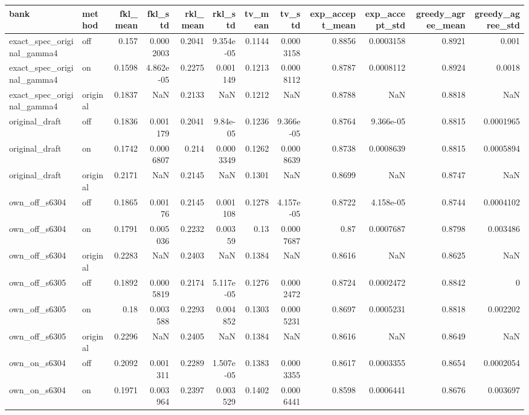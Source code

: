 \begin{table}
\label{tab:task3_alignment_main}
\begin{tabular}{llrrrrrrrrrr}
\toprule
bank & method & fkl\_mean & fkl\_std & rkl\_mean & rkl\_std & tv\_mean & tv\_std & exp\_accept\_mean & exp\_accept\_std & greedy\_agree\_mean & greedy\_agree\_std \\
\midrule
exact\_spec\_original\_gamma4 & off & 0.157 & 0.0002003 & 0.2041 & 9.354e-05 & 0.1144 & 0.0003158 & 0.8856 & 0.0003158 & 0.8921 & 0.001 \\
exact\_spec\_original\_gamma4 & on & 0.1598 & 4.862e-05 & 0.2275 & 0.001149 & 0.1213 & 0.0008112 & 0.8787 & 0.0008112 & 0.8924 & 0.0018 \\
exact\_spec\_original\_gamma4 & original & 0.1837 & NaN & 0.2133 & NaN & 0.1212 & NaN & 0.8788 & NaN & 0.8818 & NaN \\
original\_draft & off & 0.1836 & 0.001179 & 0.2041 & 9.84e-05 & 0.1236 & 9.366e-05 & 0.8764 & 9.366e-05 & 0.8815 & 0.0001965 \\
original\_draft & on & 0.1742 & 0.0006807 & 0.214 & 0.0003349 & 0.1262 & 0.0008639 & 0.8738 & 0.0008639 & 0.8815 & 0.0005894 \\
original\_draft & original & 0.2171 & NaN & 0.2145 & NaN & 0.1301 & NaN & 0.8699 & NaN & 0.8747 & NaN \\
own\_off\_s6304 & off & 0.1865 & 0.00176 & 0.2145 & 0.001108 & 0.1278 & 4.157e-05 & 0.8722 & 4.158e-05 & 0.8744 & 0.0004102 \\
own\_off\_s6304 & on & 0.1791 & 0.005036 & 0.2232 & 0.00359 & 0.13 & 0.0007687 & 0.87 & 0.0007687 & 0.8798 & 0.003486 \\
own\_off\_s6304 & original & 0.2283 & NaN & 0.2403 & NaN & 0.1384 & NaN & 0.8616 & NaN & 0.8625 & NaN \\
own\_off\_s6305 & off & 0.1892 & 0.0005819 & 0.2174 & 5.117e-05 & 0.1276 & 0.0002472 & 0.8724 & 0.0002472 & 0.8842 & 0 \\
own\_off\_s6305 & on & 0.18 & 0.003588 & 0.2293 & 0.004852 & 0.1303 & 0.0005231 & 0.8697 & 0.0005231 & 0.8818 & 0.002202 \\
own\_off\_s6305 & original & 0.2296 & NaN & 0.2405 & NaN & 0.1384 & NaN & 0.8616 & NaN & 0.8649 & NaN \\
own\_on\_s6304 & off & 0.2092 & 0.001311 & 0.2289 & 1.507e-05 & 0.1383 & 0.0003355 & 0.8617 & 0.0003355 & 0.8654 & 0.0002054 \\
own\_on\_s6304 & on & 0.1971 & 0.003964 & 0.2397 & 0.003529 & 0.1402 & 0.0006441 & 0.8598 & 0.0006441 & 0.8676 & 0.003697 \\

\end{tabular}
\end{table}
